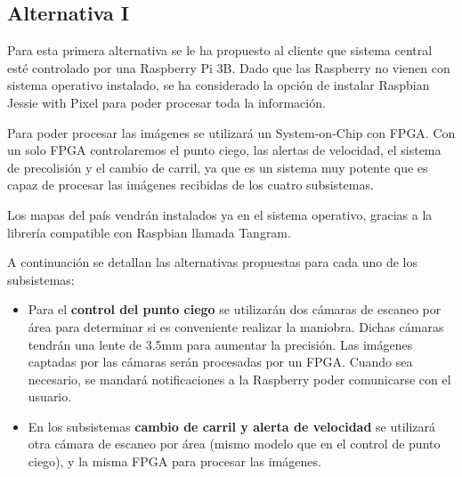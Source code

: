 \subsection{Alternativa I}

\par Para esta primera alternativa se le ha propuesto al cliente que sistema central esté controlado por una Raspberry Pi 3B. Dado que las Raspberry no vienen con sistema operativo instalado, se ha considerado la opción de instalar Raspbian Jessie with Pixel para poder procesar toda la información.
\par Para poder procesar las imágenes se utilizará un System-on-Chip con FPGA. Con un solo FPGA controlaremos el punto ciego, las alertas de velocidad, el sistema de precolisión y el cambio de carril, ya que es un sistema muy potente que es capaz de procesar las imágenes recibidas de los cuatro subsistemas.
\par Los mapas del país vendrán instalados ya en el sistema operativo, gracias a la librería compatible con Raspbian llamada Tangram.

\par A continuación se detallan las alternativas propuestas para cada uno de los subsistemas:

\begin{itemize}[-]
    \item Para el \textbf{control del punto ciego} se utilizarán dos cámaras de escaneo por área para determinar si es conveniente realizar la maniobra. Dichas cámaras tendrán una lente de 3.5mm para aumentar la precisión. Las imágenes captadas por las cámaras serán procesadas por un FPGA. Cuando sea necesario, se mandará notificaciones a la Raspberry poder comunicarse con el usuario.
    \item En los subsistemas \textbf{cambio de carril y alerta de velocidad} se utilizará otra cámara de escaneo por área (mismo modelo que en el control de punto ciego), y la misma FPGA para procesar las imágenes.
\end{itemize}


